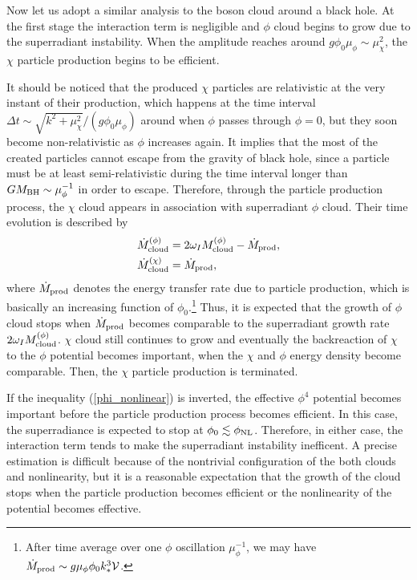 \documentclass[%
 preprint,
 nofootinbib,
 amsmath,amssymb,
 aps,
 a4paper
]{revtex4-1}
\begin{document}
Now let us adopt a similar analysis to the boson cloud around a black hole. At the first stage the interaction term is negligible and $\phi$ cloud begins to grow due to the superradiant instability. When the amplitude reaches around $g\phi_0 \mu_\phi \sim \mu_\chi^2$, the $\chi$ particle production begins to be efficient. 


It should be noticed that the produced $\chi$ particles are relativistic at the very instant of their production, which happens at the time interval $\Delta t \sim \sqrt{k^2+\mu_\chi^2}/(g\phi_0 \mu_\phi)$ around when $\phi$ passes through $\phi=0$, but they soon become non-relativistic as $\phi$ increases again. It implies that the most of the created particles cannot escape from the gravity of black hole, since a particle must be at least semi-relativistic during the time interval longer than $GM_{\rm BH} \sim \mu_\phi^{-1}$ in order to escape.
Therefore, through the particle production process, the $\chi$ cloud appears in association with superradiant $\phi$ cloud. Their time evolution is described by
\begin{align}
	&\dot M_{\rm cloud}^{(\phi)} = 2\omega_I M_{\rm cloud}^{(\phi)} - \dot M_{\rm prod},\\
	&\dot M_{\rm cloud}^{(\chi)}= \dot M_{\rm prod}, 
\end{align}
where $\dot M_{\rm prod}$ denotes the energy transfer rate due to particle production, which is basically an increasing function of $\phi_0$.\footnote{
	After time average over one $\phi$ oscillation $\mu_\phi^{-1}$, we may have $\dot M_{\rm prod}\sim g\mu_\phi \phi_0 k_*^3 \mathcal V$.
}
Thus, it is expected that the growth of $\phi$ cloud stops when $\dot M_{\rm prod}$ becomes comparable to the superradiant growth rate $2\omega_I M_{\rm cloud}^{(\phi)}$. $\chi$ cloud still continues to grow and eventually the backreaction of $\chi$ to the $\phi$ potential becomes important, when the $\chi$ and $\phi$ energy density become comparable. Then, the $\chi$ particle production is terminated.

If the inequality (\ref{phi_nonlinear}) is inverted, the effective $\phi^4$ potential becomes important before the particle production process becomes efficient. In this case, the superradiance is expected to stop at $\phi_0 \lesssim \phi_{\rm NL}$.
Therefore, in either case, the interaction term tends to make the superradiant instability inefficent.
A precise estimation is difficult because of the nontrivial configuration of the both clouds and nonlinearity, but it is a reasonable expectation that the growth of the cloud stops when the particle production becomes efficient or the nonlinearity of the potential becomes effective.
\end{document}
